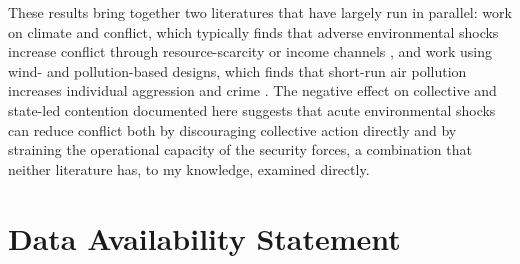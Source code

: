 \documentclass[12pt]{article}
\begin{document}
These results bring together two literatures that have largely run in parallel: work on climate and conflict, which typically finds that adverse environmental shocks increase conflict through resource-scarcity or income channels \citep{hsiang2013quantifying,burkehsiangmiguel2015}, and work using wind- and pollution-based designs, which finds that short-run air pollution increases individual aggression and crime \citep{herrnstadt2021,bondyrothsager2020,burkhardt2019}. The negative effect on collective and state-led contention documented here suggests that acute environmental shocks can reduce conflict both by discouraging collective action directly and by straining the operational capacity of the security forces, a combination that neither literature has, to my knowledge, examined directly.

\section*{Data Availability Statement}
\end{document}
